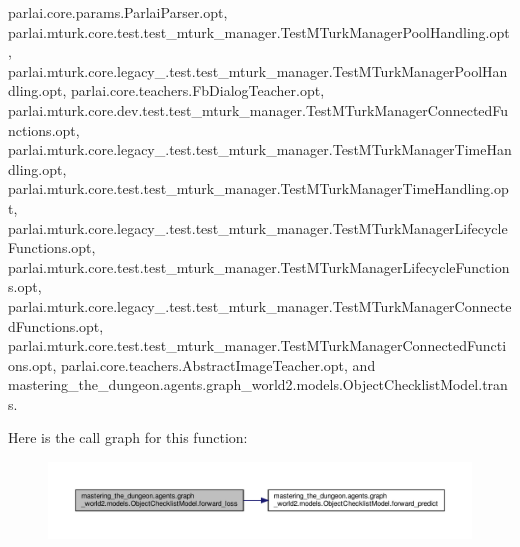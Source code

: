 parlai.\+core.\+params.\+Parlai\+Parser.\+opt, parlai.\+mturk.\+core.\+test.\+test\+\_\+mturk\+\_\+manager.\+Test\+M\+Turk\+Manager\+Pool\+Handling.\+opt, parlai.\+mturk.\+core.\+legacy\+\_.\+test.\+test\+\_\+mturk\+\_\+manager.\+Test\+M\+Turk\+Manager\+Pool\+Handling.\+opt, parlai.\+core.\+teachers.\+Fb\+Dialog\+Teacher.\+opt, parlai.\+mturk.\+core.\+dev.\+test.\+test\+\_\+mturk\+\_\+manager.\+Test\+M\+Turk\+Manager\+Connected\+Functions.\+opt, parlai.\+mturk.\+core.\+legacy\+\_.\+test.\+test\+\_\+mturk\+\_\+manager.\+Test\+M\+Turk\+Manager\+Time\+Handling.\+opt, parlai.\+mturk.\+core.\+test.\+test\+\_\+mturk\+\_\+manager.\+Test\+M\+Turk\+Manager\+Time\+Handling.\+opt, parlai.\+mturk.\+core.\+legacy\+\_.\+test.\+test\+\_\+mturk\+\_\+manager.\+Test\+M\+Turk\+Manager\+Lifecycle\+Functions.\+opt, parlai.\+mturk.\+core.\+test.\+test\+\_\+mturk\+\_\+manager.\+Test\+M\+Turk\+Manager\+Lifecycle\+Functions.\+opt, parlai.\+mturk.\+core.\+legacy\+\_.\+test.\+test\+\_\+mturk\+\_\+manager.\+Test\+M\+Turk\+Manager\+Connected\+Functions.\+opt, parlai.\+mturk.\+core.\+test.\+test\+\_\+mturk\+\_\+manager.\+Test\+M\+Turk\+Manager\+Connected\+Functions.\+opt, parlai.\+core.\+teachers.\+Abstract\+Image\+Teacher.\+opt, and mastering\+\_\+the\+\_\+dungeon.\+agents.\+graph\+\_\+world2.\+models.\+Object\+Checklist\+Model.\+trans.

Here is the call graph for this function\+:
\nopagebreak
\begin{figure}[H]
\begin{center}
\leavevmode
\includegraphics[width=350pt]{classmastering__the__dungeon_1_1agents_1_1graph__world2_1_1models_1_1ObjectChecklistModel_a003f55fcaddd7a33512dea38e338d9d9_cgraph}
\end{center}
\end{figure}
\mbox{\label{classmastering__the__dungeon_1_1agents_1_1graph__world2_1_1models_1_1ObjectChecklistModel_aabcbed1be0d98035d2cfc4d3ad151256}} 
